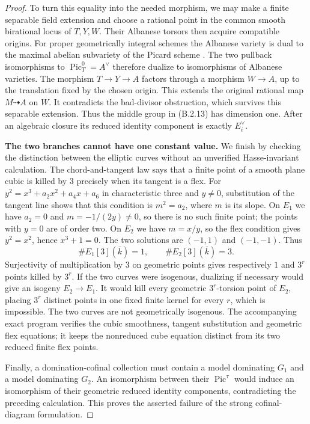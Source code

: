 \begin{proof}
To turn this equality into the needed morphism, we may make a
finite separable field extension and choose a rational point
in the common smooth birational locus of $T,Y,W$.  Their
Albanese torsors then acquire compatible origins.  For proper
geometrically integral schemes the Albanese variety is dual to
the maximal abelian subvariety of the Picard scheme
\cite[Theorem 3.2 and Remark 3.3, pp.~12--13 of the author
manuscript]{C_ACMV2026}.  The two pullback isomorphisms to
$\operatorname{Pic}^0_T=A^\vee$ therefore dualize to
isomorphisms of Albanese varieties.  The morphism
$T\to Y\to A$ factors through a morphism $W\to A$, up to
the translation fixed by the chosen origin.  This extends the
original rational map $M\dashrightarrow A$ on $W$.
It contradicts the bad-divisor obstruction, which survives
this separable extension.  Thus the middle group in (B.2.13)
has dimension one.  After an algebraic closure its reduced
identity component is exactly $E_i^\vee$.

\par\smallskip\noindent\textbf{The two branches cannot have one constant value.}\quad
We finish by checking the distinction between the elliptic
curves without an unverified Hasse-invariant calculation.
The chord-and-tangent law
\cite[Chapter I, Section 3, Theorem 3.1, pp.~25--27]{MilneEC2021B}
says that a finite point of a smooth plane cubic is killed by
$3$ precisely when its tangent is a flex.  For
$y^2=x^3+a_2x^2+a_4x+a_6$ in characteristic three and $y\ne0$,
substitution of the tangent line shows that this condition is
$m^2=a_2$, where $m$ is its slope.  On $E_1$ we have
$a_2=0$ and $m=-1/(2y)\ne0$, so there is no such finite point;
the points with $y=0$ are of order two.  On $E_2$ we have
$m=x/y$, so the flex condition gives $y^2=x^2$, hence
$x^3+1=0$.  The two solutions are $(-1,1)$ and $(-1,-1)$.
Thus
\[
 \#E_1[3](\bar k)=1,\qquad \#E_2[3](\bar k)=3.
\]
Surjectivity of multiplication by $3$ on geometric points
gives respectively $1$ and $3^r$ points killed by $3^r$.
If the two curves were isogenous, dualizing if necessary would
give an isogeny $E_2\to E_1$.  It would kill every geometric
$3^r$-torsion point of $E_2$, placing $3^r$ distinct points in
one fixed finite kernel for every $r$, which is impossible.
The two curves are not geometrically isogenous.
The accompanying exact program verifies the cubic smoothness,
tangent substitution and geometric flex equations; it keeps
the nonreduced cube equation distinct from its two reduced
finite flex points.

Finally, a domination-cofinal collection must contain a model
dominating $G_1$ and a model dominating $G_2$.  An isomorphism
between their $\operatorname{Pic}^{\tau}$ would induce an
isomorphism of their geometric reduced identity components,
contradicting the preceding calculation.  This proves the
asserted failure of the strong cofinal-diagram formulation.
\end{proof}

